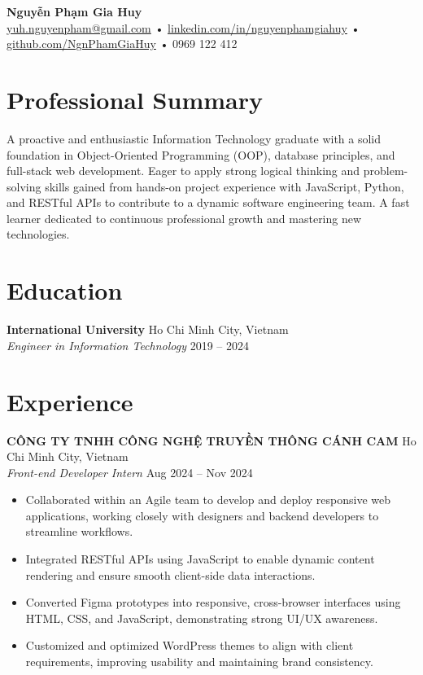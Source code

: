 \documentclass[a4paper,11pt]{article}
\begin{document}
{\centering
    {\Huge \bfseries Nguyễn Phạm Gia Huy} \\
    \vspace{4pt}
    \normalsize\href{mailto:yuh.nguyenpham@gmail.com}{yuh.nguyenpham@gmail.com} •
    \normalsize\href{https://linkedin.com/in/nguyenphamgiahuy}{linkedin.com/in/nguyenphamgiahuy} •
    \normalsize\href{https://github.com/NgnPhamGiaHuy}{github.com/NgnPhamGiaHuy} •
    \normalsize0969 122 412
}
\vspace{4pt}
\section*{Professional Summary}
A proactive and enthusiastic Information Technology graduate with a solid foundation in Object-Oriented Programming (OOP), database principles, and full-stack web development. Eager to apply strong logical thinking and problem-solving skills gained from hands-on project experience with JavaScript, Python, and RESTful APIs to contribute to a dynamic software engineering team. A fast learner dedicated to continuous professional growth and mastering new technologies.

\section*{Education}
\textbf{International University} \hfill Ho Chi Minh City, Vietnam \\
\textit{Engineer in Information Technology} \hfill 2019 – 2024

\section*{Experience}
\textbf{CÔNG TY TNHH CÔNG NGHỆ TRUYỀN THÔNG CÁNH CAM} \hfill Ho Chi Minh City, Vietnam \\
\textit{Front-end Developer Intern} \hfill Aug 2024 – Nov 2024
\begin{itemize}[leftmargin=*, noitemsep, topsep=0pt, partopsep=0pt, parsep=0pt, itemsep=0pt]
    \item Collaborated within an Agile team to develop and deploy responsive web applications, working closely with designers and backend developers to streamline workflows.
    \item Integrated RESTful APIs using JavaScript to enable dynamic content rendering and ensure smooth client-side data interactions.
    \item Converted Figma prototypes into responsive, cross-browser interfaces using HTML, CSS, and JavaScript, demonstrating strong UI/UX awareness.
    \item Customized and optimized WordPress themes to align with client requirements, improving usability and maintaining brand consistency.
\end{itemize}
\end{document}
